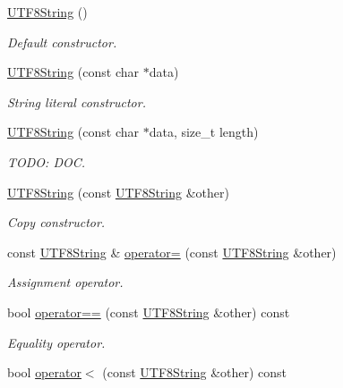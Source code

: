 \begin{DoxyCompactItemize}
\item 
\hyperlink{classchaos_1_1str_1_1_u_t_f8_string_a173513bf2d62d742bee337b00716bf82}{U\-T\-F8\-String} ()
\begin{DoxyCompactList}\small\item\em Default constructor. \end{DoxyCompactList}\item 
\hyperlink{classchaos_1_1str_1_1_u_t_f8_string_af506696bfe777057c4a7e6b6acf19dab}{U\-T\-F8\-String} (const char $\ast$data)
\begin{DoxyCompactList}\small\item\em String literal constructor. \end{DoxyCompactList}\item 
\hyperlink{classchaos_1_1str_1_1_u_t_f8_string_ac3077c0963a5f36dcaa2a87a1c02d05d}{U\-T\-F8\-String} (const char $\ast$data, size\-\_\-t length)
\begin{DoxyCompactList}\small\item\em T\-O\-D\-O\-: D\-O\-C. \end{DoxyCompactList}\item 
\hyperlink{classchaos_1_1str_1_1_u_t_f8_string_a194b76859245fdb815ce5d537f2e1db4}{U\-T\-F8\-String} (const \hyperlink{classchaos_1_1str_1_1_u_t_f8_string}{U\-T\-F8\-String} \&other)
\begin{DoxyCompactList}\small\item\em Copy constructor. \end{DoxyCompactList}\item 
const \hyperlink{classchaos_1_1str_1_1_u_t_f8_string}{U\-T\-F8\-String} \& \hyperlink{classchaos_1_1str_1_1_u_t_f8_string_afcf35cf97971d9d38104745e6160b942}{operator=} (const \hyperlink{classchaos_1_1str_1_1_u_t_f8_string}{U\-T\-F8\-String} \&other)
\begin{DoxyCompactList}\small\item\em Assignment operator. \end{DoxyCompactList}\item 
bool \hyperlink{classchaos_1_1str_1_1_u_t_f8_string_ae4446150398d498e8aa9ebbc05ca7b52}{operator==} (const \hyperlink{classchaos_1_1str_1_1_u_t_f8_string}{U\-T\-F8\-String} \&other) const 
\begin{DoxyCompactList}\small\item\em Equality operator. \end{DoxyCompactList}\item 
bool \hyperlink{classchaos_1_1str_1_1_u_t_f8_string_ac7b54ed9c42a9c9a0a386d453d2c1daa}{operator$<$} (const \hyperlink{classchaos_1_1str_1_1_u_t_f8_string}{U\-T\-F8\-String} \&other) const 

\end{DoxyCompactItemize}
